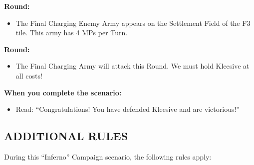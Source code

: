 \begin{multicols*}{2}
\textbf{ Round:}
\begin{itemize}
  \item The Final Charging Enemy Army appears on the Settlement Field of the F3 tile. This army has 4 MPs per Turn.
\end{itemize}

\textbf{ Round:}
\begin{itemize}
  \item The Final Charging Army will attack this Round. We must hold Kleesive at all costs!
\end{itemize}

\textbf{When you complete the scenario:}
\begin{itemize}
  \item Read: ``Congratulations! You have defended Kleesive and are victorious!''
\end{itemize}

\subsection*{\MakeUppercase{Additional rules}}

During this ``Inferno'' Campaign scenario, the following rules apply:


\end{multicols*}
